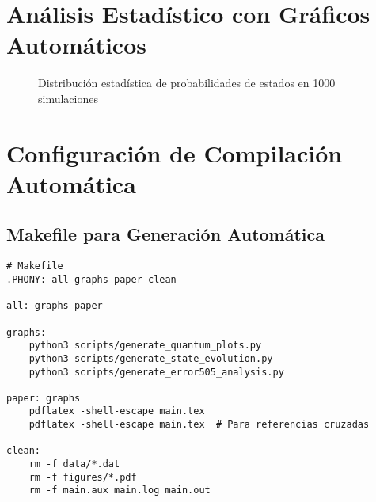 \documentclass[12pt,a4paper]{article}
\begin{document}
\section{Análisis Estadístico con Gráficos Automáticos}

\begin{figure}[htbp]
\centering
{}
\caption{Distribución estadística de probabilidades de estados en 1000 simulaciones}
\label{fig:probability_distribution}
\end{figure}

\section{Configuración de Compilación Automática}

\subsection{Makefile para Generación Automática}

\begin{verbatim}
# Makefile
.PHONY: all graphs paper clean

all: graphs paper

graphs:
    python3 scripts/generate_quantum_plots.py
    python3 scripts/generate_state_evolution.py
    python3 scripts/generate_error505_analysis.py

paper: graphs
    pdflatex -shell-escape main.tex
    pdflatex -shell-escape main.tex  # Para referencias cruzadas

clean:
    rm -f data/*.dat
    rm -f figures/*.pdf
    rm -f main.aux main.log main.out
\end{verbatim}
\end{document}
